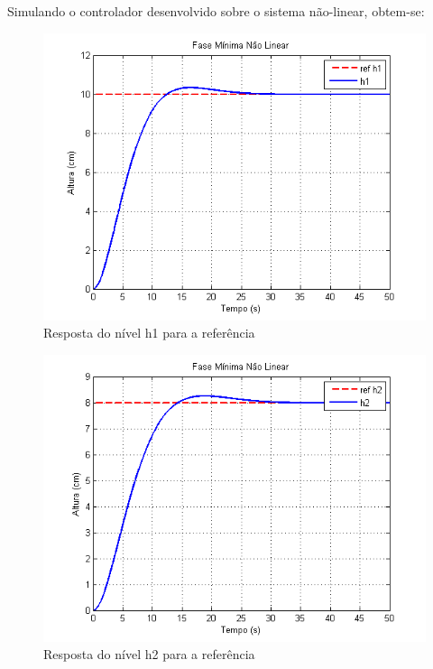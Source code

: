 \documentclass[11pt,]{article}
\begin{document}
        Simulando o controlador desenvolvido sobre o sistema não-linear, obtem-se:
         \begin{figure}[H]
               	\centering
               	\includegraphics[scale=1]{h1_lin15.png}
               	\caption{Resposta do nível h1 para a referência}
               	\label{H1_lin15}
         \end{figure}
         \begin{figure}[H]
         	\centering
         	\includegraphics[scale=1]{h2_lin15.png}
         	\caption{Resposta do nível h2 para a referência}
         	\label{H2_lin15}
         \end{figure}
\end{document}
